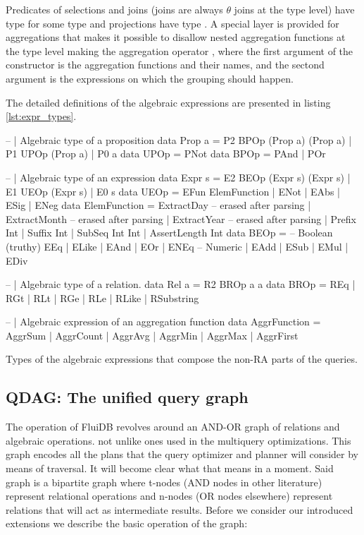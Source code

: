 Predicates of selections and joins (joins are always \(\theta\) joins
at the type level) have type  for some type
 and projections have type . A
special layer is provided for aggregations  that makes it
possible to disallow nested aggregation functions at the type level
making the aggregation operator , where the first argument of the constructor is the
aggregation functions and their names, and the sectond argument is the
expressions on which the grouping should happen.

The detailed definitions of the algebraic expressions are presented in
listing \ref{lst:expr_types}.

\begin{code}
  \begin{haskellcode}
    -- | Algebraic type of a proposition
    data Prop a = P2 BPOp (Prop a) (Prop a)
      | P1 UPOp (Prop a)
      | P0 a
    data UPOp = PNot
    data BPOp = PAnd | POr

    -- | Algebraic type of an expression
    data Expr s = E2 BEOp (Expr s) (Expr s)
      | E1 UEOp (Expr s)
      | E0 s
    data UEOp =
      EFun ElemFunction
      | ENot
      | EAbs
      | ESig
      | ENeg
    data ElemFunction
      = ExtractDay -- erased after parsing
      | ExtractMonth -- erased after parsing
      | ExtractYear -- erased after parsing
      | Prefix Int
      | Suffix Int
      | SubSeq Int Int
      | AssertLength Int
    data BEOp =
      -- Boolean (truthy)
      EEq | ELike | EAnd | EOr | ENEq
      -- Numeric
      | EAdd | ESub | EMul | EDiv

    -- | Algebraic type of a relation.
    data Rel a = R2 BROp a a
    data BROp
      = REq
      | RGt
      | RLt
      | RGe
      | RLe
      | RLike
      | RSubstring

    -- | Algebraic expression of an aggregation function
    data AggrFunction = AggrSum
      | AggrCount
      | AggrAvg
      | AggrMin
      | AggrMax
      | AggrFirst
  \end{haskellcode}
  \label{lst:expr_types}
  \caption{Types of the algebraic expressions that
    compose the non-RA parts of the queries.}
\end{code}


\subsection{QDAG: The unified query graph}
\label{sec:org5a9ec3b}
The operation of FluiDB revolves around an AND-OR graph of relations
and algebraic operations. not unlike ones used in the multiquery
optimizations. This graph encodes all the plans that the query
optimizer and planner will consider by means of traversal. It will
become clear what that means in a moment. Said graph is a bipartite
graph where t-nodes (AND nodes in other literature) represent
relational operations and n-nodes (OR nodes elsewhere) represent
relations that will act as intermediate results. Before we consider
our introduced extensions we describe the basic operation of the
graph:

